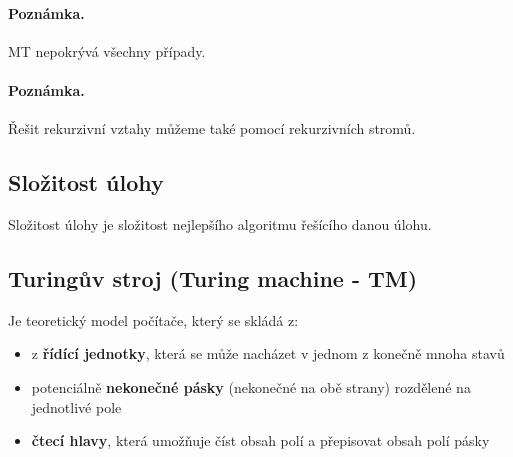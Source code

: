 \paragraph{Poznámka.} MT nepokrývá všechny případy.


\paragraph{Poznámka.} Řešit rekurzivní vztahy můžeme také pomocí rekurzivních stromů.

\example


\subsection*{Složitost úlohy}
Složitost úlohy je složitost nejlepšího algoritmu řešícího danou úlohu.

\label{heading:tm}
\subsection*{Turingův stroj (Turing machine - TM)}
Je teoretický model počítače, který se skládá z:

\begin{itemize}[itemsep=0pt]
    \item z \textbf{řídící jednotky}, která se může nacházet v jednom z konečně mnoha stavů
    \item potenciálně \textbf{nekonečné pásky} (nekonečné na obě strany) rozdělené na jednotlivé pole
    \item \textbf{čtecí hlavy}, která umožňuje číst obsah polí a přepisovat obsah polí pásky
\end{itemize}


